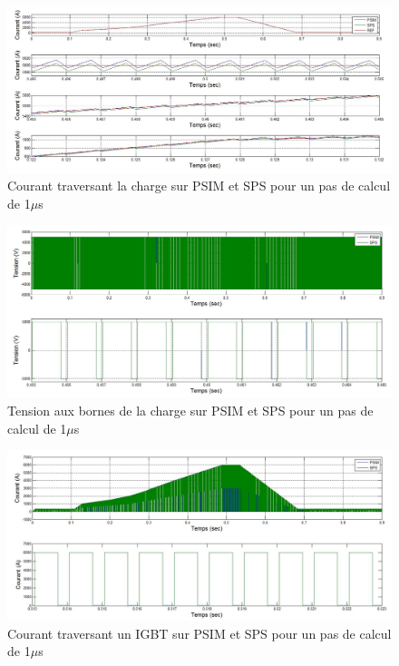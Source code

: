 \documentclass[11pt,letterpaper,final]{report}
\begin{document}
\begin{figure}[htb]
\centering
\includegraphics[scale=0.5]{Fig/Hacheur4Quadrants/HacheurCourantCharge1u.jpg}
\caption{Courant traversant la charge sur PSIM et SPS pour un pas de calcul de 1$\mu$s}
\label{hc_cou_ch_1}
\end{figure}


\begin{figure}[htb]
\centering
\includegraphics[scale=0.5]{Fig/Hacheur4Quadrants/HacheurTensionCharge1u.jpg}
\caption{Tension aux bornes de la charge sur PSIM et SPS pour un pas de calcul de 1$\mu$s}
\label{hc_ten_ch_1}
\end{figure}


\begin{figure}[htb]
\centering
\includegraphics[scale=0.5]{Fig/Hacheur4Quadrants/HacheurCourantIGBT1u.jpg}
\caption{Courant traversant un IGBT sur PSIM et SPS pour un pas de calcul de 1$\mu$s}
\label{hc_IG_cou_1}
\end{figure}
\end{document}
